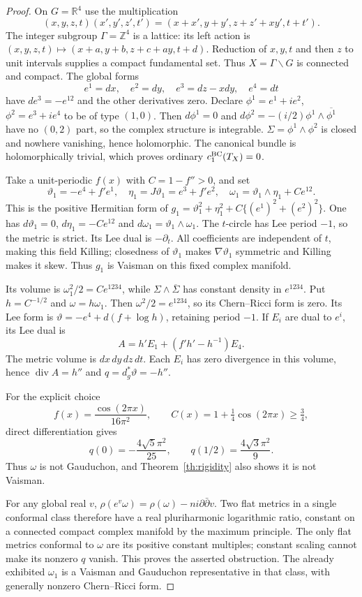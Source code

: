 \documentclass[11pt]{article}
\begin{document}
\begin{proof}
On $G=\mathbb R^4$ use the multiplication
\[
 (x,y,z,t)(x',y',z',t')=(x+x',y+y',z+z'+xy',t+t').
\]
The integer subgroup $\Gamma=\mathbb Z^4$ is a lattice: its left
action is $(x,y,z,t)\mapsto(x+a,y+b,z+c+ay,t+d)$.
Reduction of $x,y,t$ and then $z$ to unit intervals supplies a compact
fundamental set. Thus $X=\Gamma\backslash G$ is connected and compact.
The global forms
\[
 e^1=dx,\quad e^2=dy,\quad e^3=dz-xdy,\quad e^4=dt
\]
have $de^3=-e^{12}$ and the other derivatives zero. Declare
$\phi^1=e^1+i e^2$, $\phi^2=e^3+i e^4$ to be of type $(1,0)$.
Then $d\phi^1=0$ and
$d\phi^2=-(i/2)\phi^1\wedge\overline{\phi^1}$ have no $(0,2)$
part, so the complex structure is integrable.
$\Sigma=\phi^1\wedge\phi^2$ is closed and nowhere vanishing,
hence holomorphic. The canonical bundle is holomorphically trivial,
which proves ordinary $c_1^{\rm BC}(T_X)=0$.

Take a unit-periodic $f(x)$ with $C=1-f''>0$, and set
\[
 \vartheta_1=-e^4+f'e^1,\quad \eta_1=J\vartheta_1=e^3+f'e^2,
 \quad \omega_1=\vartheta_1\wedge\eta_1+C e^{12}.
\]
This is the positive Hermitian form of
$g_1=\vartheta_1^2+\eta_1^2+C\{(e^1)^2+(e^2)^2\}$.
One has $d\vartheta_1=0$, $d\eta_1=-C e^{12}$ and
$d\omega_1=\vartheta_1\wedge\omega_1$.
The $t$-circle has Lee period $-1$, so the metric is strict.
Its Lee dual is $-\partial_t$. All coefficients are independent of
$t$, making this field Killing; closedness of $\vartheta_1$ makes
$\nabla\vartheta_1$ symmetric and Killing makes it skew. Thus $g_1$
is Vaisman on this fixed complex manifold.

Its volume is $\omega_1^2/2=C e^{1234}$, while
$\Sigma\wedge\overline\Sigma$ has constant density in $e^{1234}$.
Put $h=C^{-1/2}$ and $\omega=h\omega_1$. Then
$\omega^2/2=e^{1234}$, so its Chern--Ricci form is zero. Its Lee form
is $\vartheta=-e^4+d(f+\log h)$, retaining period $-1$.
If $E_i$ are dual to $e^i$, its Lee dual is
\[
 A=h'E_1+(f'h'-h^{-1})E_4.
\]
The metric volume is $dx\,dy\,dz\,dt$. Each $E_i$ has zero
divergence in this volume, hence $\operatorname{div}A=h''$ and
$q=d_g^*\vartheta=-h''$.

For the explicit choice
\[
 f(x)=\frac{\cos(2\pi x)}{16\pi^2},\qquad
 C(x)=1+\tfrac14\cos(2\pi x)\geq\tfrac34,
\]
direct differentiation gives
\[
 q(0)=-\frac{4\sqrt5\pi^2}{25},\qquad
 q(1/2)=\frac{4\sqrt3\pi^2}{9}.
\]
Thus $\omega$ is not Gauduchon, and Theorem~\ref{th:rigidity}
also shows it is not Vaisman.

For any global real $v$,
$\rho(e^v\omega)=\rho(\omega)-n i\partial\bar\partial v$.
Two flat metrics in a single conformal class therefore have a real
pluriharmonic logarithmic ratio, constant on a connected compact
complex manifold by the maximum principle. The only flat metrics
conformal to $\omega$ are its positive constant multiples; constant
scaling cannot make its nonzero $q$ vanish. This proves the asserted
obstruction. The already exhibited $\omega_1$ is a Vaisman and
Gauduchon representative in that class, with generally nonzero
Chern--Ricci form.
\end{proof}
\end{document}
